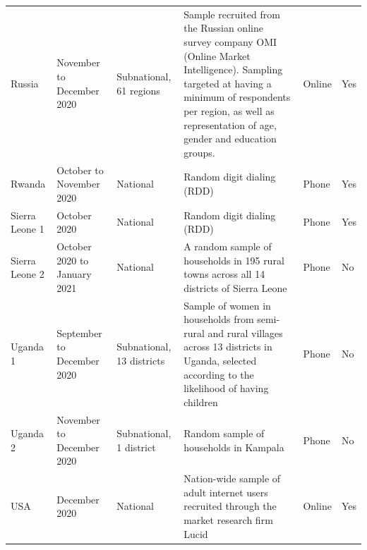 \documentclass[
  12pt,
]{article}
\begin{document}
\begin{landscape}
\begin{table}[!h]
{\begin{tabular}[t]{>{\raggedright\arraybackslash}p{8em}>{\raggedright\arraybackslash}p{8em}>{\raggedright\arraybackslash}p{12em}>{\raggedright\arraybackslash}p{30em}ll}
Russia & November to December 2020 & Subnational, 61 regions & Sample recruited from the Russian online survey company OMI (Online Market Intelligence). Sampling targeted at having a minimum of respondents per region, as well as representation of age, gender and education groups. & Online & Yes\\
Rwanda & October to November 2020 & National & Random digit dialing (RDD) & Phone & Yes\\
Sierra Leone 1 & October 2020 & National & Random digit dialing (RDD) & Phone & Yes\\
Sierra Leone 2 & October 2020 to January 2021 & National & A random sample of households in 195 rural towns across all 14 districts of Sierra Leone & Phone & No\\
Uganda 1 & September to December 2020 & Subnational, 13 districts & Sample of women in households from semi-rural and rural villages across 13 districts in Uganda, selected according to the likelihood of having children & Phone & No\\
Uganda 2 & November to December 2020 & Subnational, 1 district & Random sample of households in Kampala & Phone & No\\
USA & December 2020 & National & Nation-wide sample of adult internet users recruited through the market research firm Lucid & Online & Yes\\
\bottomrule
\end{tabular}}
\end{table}
\end{landscape}
\end{document}
